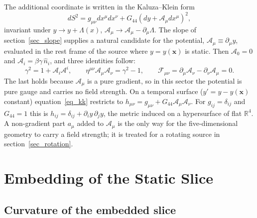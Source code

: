 \documentclass[pdflatex,sn-mathphys-num]{sn-jnl}%
\theoremstyle{thmstyleone}%
\theoremstyle{thmstyletwo}%
\theoremstyle{thmstylethree}%
\begin{document}
The additional coordinate is written in the Kaluza--Klein form~\cite{Kaluza1921,Klein1926}
\begin{equation}\label{eq_kk}
    dS^2=g_{\mu\nu}dx^\mu dx^\nu+G_{44}\left(dy+\mathcal{A}_\mu dx^\mu\right)^2 ,
\end{equation}
invariant under $y\to y+\Lambda(x)$, $\mathcal{A}_\mu\to\mathcal{A}_\mu-\partial_\mu\Lambda$. The slope of section~\ref{sec_slope} supplies a natural candidate for the potential, $\mathcal{A}_\mu\equiv\partial_\mu y$, evaluated in the rest frame of the source where $y=y(\mathbf{x})$ is static. Then $\mathcal{A}_0=0$ and $\mathcal{A}_i=\beta\gamma\,\hat{n}_i$, and three identities follow:
\begin{equation}\label{eq_potential_identities}
    \gamma^2=1+\mathcal{A}_i\mathcal{A}^i,\qquad
    \eta^{\mu\nu}\mathcal{A}_\mu\mathcal{A}_\nu=\gamma^2-1,\qquad
    \mathcal{F}_{\mu\nu}=\partial_\mu\mathcal{A}_\nu-\partial_\nu\mathcal{A}_\mu=0 .
\end{equation}
The last holds because $\mathcal{A}_\mu$ is a pure gradient, so in this sector the potential is pure gauge and carries no field strength. On a temporal surface ($y'=y-y(\mathbf{x})$ constant) equation~\eqref{eq_kk} restricts to $h_{\mu\nu}=g_{\mu\nu}+G_{44}\mathcal{A}_\mu\mathcal{A}_\nu$. For $g_{ij}=\delta_{ij}$ and $G_{44}=1$ this is $h_{ij}=\delta_{ij}+\partial_iy\,\partial_jy$, the metric induced on a hypersurface of flat $\mathbb{R}^4$. A non-gradient part $a_\mu$ added to $\mathcal{A}_\mu$ is the only way for the five-dimensional geometry to carry a field strength; it is treated for a rotating source in section~\ref{sec_rotation}.

\section{Embedding of the Static Slice}\label{sec_slice}

\subsection{Curvature of the embedded slice}
\end{document}
